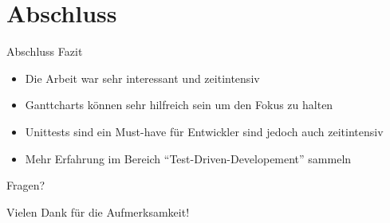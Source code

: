\documentclass[12pt, aspectratio=1610]{beamer}
\begin{document}
\section{Abschluss}
\label{sec:org503859b}
\begin{frame}[label={sec:org28d5199}]{Abschluss}
\alert{Fazit}
\begin{itemize}
\item <2-> Die Arbeit war sehr interessant und zeitintensiv
\item <3-> Ganttcharts können sehr hilfreich sein um den Fokus zu halten
\item <4-> Unittests sind ein Must-have für Entwickler sind jedoch auch zeitintensiv
\item <5-> Mehr Erfahrung im Bereich "`Test-Driven-Developement"' sammeln
\end{itemize}
\end{frame}

\begin{frame}[label={sec:org7b779a7}]{}
\alert{\huge{Fragen?}}
\end{frame}
\begin{frame}[label={sec:org3fb147b}]{}
\alert{\huge{Vielen Dank für die Aufmerksamkeit!}}
\end{frame}
\end{document}
